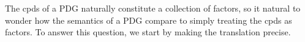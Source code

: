 \documentclass[letterpaper]{article} %
\theoremstyle{plain}
\theoremstyle{definition}
\theoremstyle{remark}
\begin{document}
The cpds of a PDG naturally constitute a collection of factors,
so it natural to wonder how the semantics of a PDG compare to 
simply treating the cpds as factors. To answer this question, we start by making
the translation precise.
\end{document}
